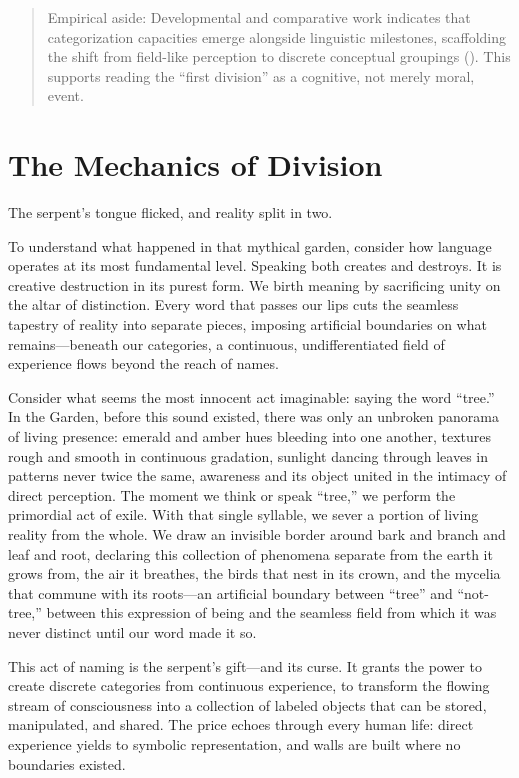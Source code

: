 \begin{quote}\small
Empirical aside: Developmental and comparative work indicates that categorization capacities emerge alongside linguistic milestones, scaffolding the shift from field-like perception to discrete conceptual groupings (\parencite{tomasello2008origins,deacon1997symbolic}). This supports reading the “first division” as a cognitive, not merely moral, event.
\end{quote}

\section{The Mechanics of Division}

The serpent's tongue flicked, and reality split in two.

To understand what happened in that mythical garden, consider how language operates at its most fundamental level. Speaking both creates and destroys. It is creative destruction in its purest form. We birth meaning by sacrificing unity on the altar of distinction. Every word that passes our lips cuts the seamless tapestry of reality into separate pieces, imposing artificial boundaries on what remains—beneath our categories, a continuous, undifferentiated field of experience flows beyond the reach of names.

Consider what seems the most innocent act imaginable: saying the word “tree.” In the Garden, before this sound existed, there was only an unbroken panorama of living presence: emerald and amber hues bleeding into one another, textures rough and smooth in continuous gradation, sunlight dancing through leaves in patterns never twice the same, awareness and its object united in the intimacy of direct perception. The moment we think or speak “tree,” we perform the primordial act of exile. With that single syllable, we sever a portion of living reality from the whole. We draw an invisible border around bark and branch and leaf and root, declaring this collection of phenomena separate from the earth it grows from, the air it breathes, the birds that nest in its crown, and the mycelia that commune with its roots—an artificial boundary between “tree” and “not-tree,” between this expression of being and the seamless field from which it was never distinct until our word made it so.

This act of naming is the serpent's gift—and its curse. It grants the power to create discrete categories from continuous experience, to transform the flowing stream of consciousness into a collection of labeled objects that can be stored, manipulated, and shared. The price echoes through every human life: direct experience yields to symbolic representation, and walls are built where no boundaries existed.

